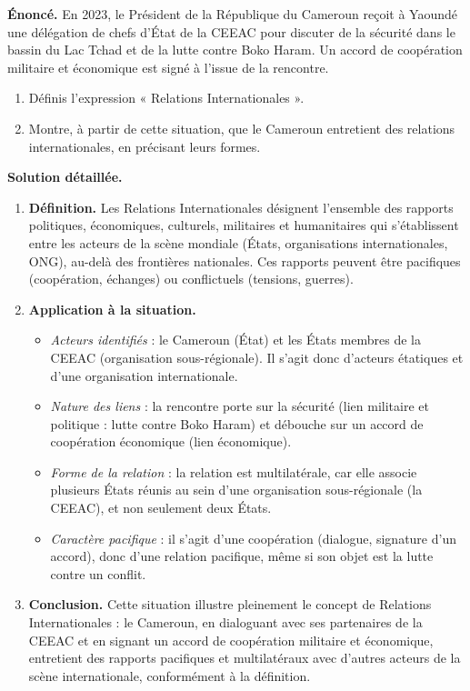 \documentclass[11pt]{article}
\newcommand{\cle}[1]{{\popxbold\color{popdark}#1}}
\begin{document}
\begin{exoresolu}
\textbf{Énoncé.} En 2023, le Président de la République du Cameroun reçoit à Yaoundé une délégation de chefs d'État de la CEEAC pour discuter de la sécurité dans le bassin du Lac Tchad et de la lutte contre Boko Haram. Un accord de coopération militaire et économique est signé à l'issue de la rencontre.
\begin{enumerate}
\item Définis l'expression « Relations Internationales ».
\item Montre, à partir de cette situation, que le Cameroun entretient des relations internationales, en précisant leurs formes.
\end{enumerate}
\tcblower
\textbf{Solution détaillée.}
\begin{enumerate}
\item \textbf{Définition.} Les Relations Internationales désignent l'ensemble des rapports politiques, économiques, culturels, militaires et humanitaires qui s'établissent entre les acteurs de la scène mondiale (États, organisations internationales, ONG), au-delà des frontières nationales. Ces rapports peuvent être pacifiques (coopération, échanges) ou conflictuels (tensions, guerres).
\item \textbf{Application à la situation.}
\begin{itemize}
\item \emph{Acteurs identifiés} : le Cameroun (État) et les États membres de la CEEAC (organisation sous-régionale). Il s'agit donc d'acteurs étatiques et d'une organisation internationale.
\item \emph{Nature des liens} : la rencontre porte sur la sécurité (lien militaire et politique : lutte contre Boko Haram) et débouche sur un accord de coopération économique (lien économique).
\item \emph{Forme de la relation} : la relation est \cle{multilatérale}, car elle associe plusieurs États réunis au sein d'une organisation sous-régionale (la CEEAC), et non seulement deux États.
\item \emph{Caractère pacifique} : il s'agit d'une coopération (dialogue, signature d'un accord), donc d'une relation pacifique, même si son objet est la lutte contre un conflit.
\end{itemize}
\item \textbf{Conclusion.} Cette situation illustre pleinement le concept de Relations Internationales : le Cameroun, en dialoguant avec ses partenaires de la CEEAC et en signant un accord de coopération militaire et économique, entretient des rapports pacifiques et multilatéraux avec d'autres acteurs de la scène internationale, conformément à la définition.
\end{enumerate}
\end{exoresolu}
\end{document}
